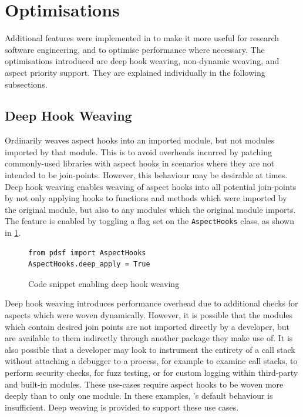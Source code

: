 \section{Optimisations}
\label{pdsf3_optimisations}

Additional features were implemented in \pdsfthree to make it
more useful for research software engineering, and to optimise performance where
necessary. The optimisations introduced are deep hook weaving, non-dynamic
weaving, and aspect priority support. They are explained individually in the
following subsections.

\subsection{Deep Hook Weaving}\label{deep_hook_weaving}

Ordinarily \pdsfthree weaves aspect hooks into an imported module, but not modules
imported by that module. This is to avoid overheads incurred by patching
commonly-used libraries with aspect hooks in scenarios where they are not
intended to be join-points. However, this behaviour may be desirable at times.
Deep hook weaving enables weaving of aspect hooks into all potential join-points
by not only applying hooks to functions and methods which were imported by the
original module, but also to any modules which the original module imports. The
feature is enabled by toggling a flag set on the \lstinline{AspectHooks} class,
as shown in \cref{fig:enabling_deep_apply}.

\begin{figure}[h]
    \begin{lstlisting}[style=footnotesize_python]
from pdsf import AspectHooks
AspectHooks.deep_apply = True
    \end{lstlisting}
    \caption{Code snippet enabling deep hook weaving}
    \label{fig:enabling_deep_apply}
\end{figure}

Deep hook weaving introduces performance overhead due to additional checks for
aspects which were woven dynamically. However, it is possible that the modules
which contain desired join points are not imported directly by a developer, but
are available to them indirectly through another package they make use of. It is
also possible that a developer may look to instrument the entirety of a call
stack without attaching a debugger to a process, for example to examine call
stacks, to perform security checks, for fuzz testing, or for custom logging
within third-party and built-in modules. These use-cases require aspect hooks to
be woven more deeply than to only one module. In these examples, \pdsfthree{}'s
default behaviour is insufficient. Deep weaving is provided to support these use
cases.

